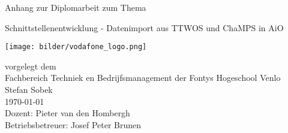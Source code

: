 

\begin{titlepage}
\vspace{4em}
\center
 \Large{\textsf{Anhang zur Diplomarbeit zum Thema}}
 \vspace{1em}

\Huge{\textsf{Schnittstellenentwicklung - Datenimport aus TTWOS und ChaMPS in AiO}}
\vspace{1em}
\\
\begin{center}
	\texttt{[image: bilder/vodafone\_logo.png]}
\end{center}
\vspace{1em}
\Large{
\textsf{
vorgelegt dem\\
Fachbereich Techniek en Bedrijfsmanagement der Fontys Hogeschool Venlo
}
}
\vspace{2em}
\\
\Large{
\textsf{
Stefan Sobek\\
\today
\vspace{2em}
\\
Dozent: Pieter van den Hombergh\\
Betriebsbetreuer: Josef Peter Brunen
}
}
\end{titlepage}